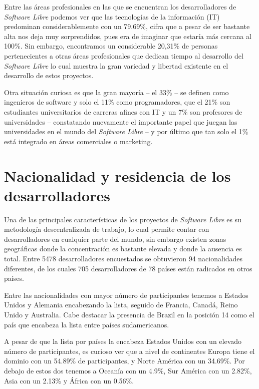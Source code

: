 Entre las áreas profesionales en las que se encuentran los desarrolladores de \textit{Software Libre} podemos ver que las tecnologías de la información (IT) predominan considerablemente con un 79.69\%, cifra que a pesar de ser bastante alta nos deja muy sorprendidos, pues era de imaginar que estaría más cercana al 100\%.  Sin embargo,  encontramos un considerable 20,31\% de personas pertenecientes  a otras áreas profesionales que dedican tiempo al desarrollo del \textit{Software Libre} lo cual muestra la gran variedad y  libertad existente en el desarrollo de estos proyectos. 

Otra situación curiosa es que la gran mayoría  – el 33\% –  se definen como ingenieros de software y solo el 11\% como programadores, que el 21\% son estudiantes universitarios de carreras afines con IT y un 7\% son profesores de universidades  –  constatando nuevamente el importante papel que juegan las universidades en el mundo del \textit{Software Libre} –  y por último que tan solo el 1\% está integrado en áreas comerciales o marketing.
 
\section{Nacionalidad y residencia de los desarrolladores}

Una de las principales características de los proyectos de \textit{Software Libre} es su metodología descentralizada de trabajo, lo cual permite contar con desarrolladores en cualquier parte del mundo,  sin embargo existen zonas geográficas donde la concentración es bastante elevada y donde la ausencia es total. Entre 5478 desarrolladores encuestados se obtuvieron 94 nacionalidades diferentes, de los cuales 705 desarrolladores de 78 países están radicados en otros países. 

Entre las nacionalidades con mayor número de participantes tenemos a Estados Unidos y Alemania encabezando la lista, seguido de Francia, Canadá, Reino Unido y Australia. Cabe destacar la presencia de Brazil en la posición 14 como el país que encabeza la lista entre países sudamericanos.

A pesar de que la lista por países la encabeza Estados Unidos con un elevado número de participantes, es curioso ver que a nivel de continentes Europa tiene el dominio con un 54.89\% de participantes, y Norte América con un 34.69\%. Por debajo de estos dos tenemos a Oceanía con un 4.9\%,  Sur América con un 2.82\%, Asia con un 2.13\% y África con un 0.56\%.

